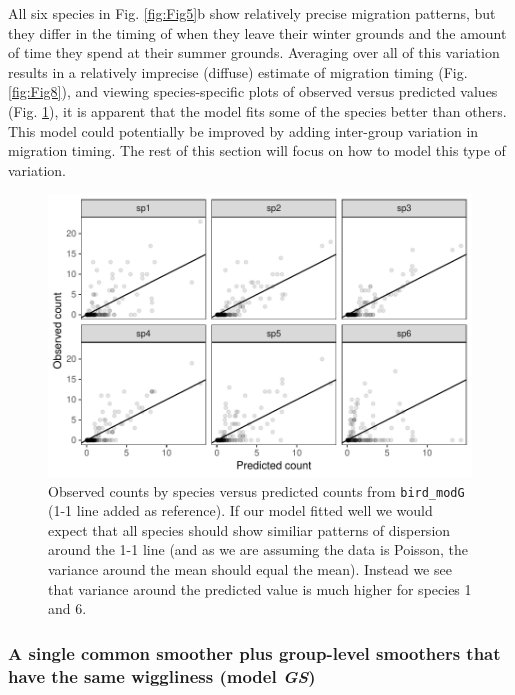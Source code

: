 \documentclass[12pt]{article}
\begin{document}
All six species in Fig. \ref{fig:Fig5}b show relatively precise
migration patterns, but they differ in the timing of when they leave
their winter grounds and the amount of time they spend at their summer
grounds. Averaging over all of this variation results in a relatively
imprecise (diffuse) estimate of migration timing (Fig. \ref{fig:Fig8}),
and viewing species-specific plots of observed versus predicted values
(Fig. \ref{fig:Fig9}), it is apparent that the model fits some of the
species better than others. This model could potentially be improved by
adding inter-group variation in migration timing. The rest of this
section will focus on how to model this type of variation.

\begin{figure}
\includegraphics[width=\linewidth]{../figures/Fig9} \caption{\label{fig:Fig9}Observed counts by species versus predicted counts from \texttt{bird\_modG} (1-1 line added as reference). If our model fitted well we would expect that all species should show similiar patterns of dispersion around the 1-1 line (and as we are assuming the data is Poisson, the variance around the mean should equal the mean). Instead we see that variance around the predicted value is much higher for species 1 and 6.}\label{fig:Fig9}
\end{figure}

\subsubsection{\texorpdfstring{A single common smoother plus group-level
smoothers that have the same wiggliness (model
\emph{GS})}{A single common smoother plus group-level smoothers that have the same wiggliness (model GS)}}\label{a-single-common-smoother-plus-group-level-smoothers-that-have-the-same-wiggliness-model-gs}
\end{document}
